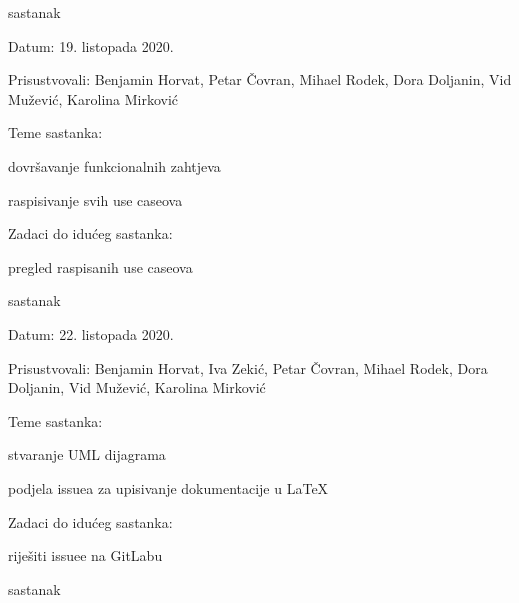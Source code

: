 \begin{packed_enum}
		\item  sastanak
		
		\item[] \begin{packed_item}
			\item Datum: 19. listopada 2020.
			\item Prisustvovali: Benjamin Horvat, Petar Čovran, Mihael Rodek, Dora Doljanin, Vid Mužević, Karolina Mirković
			\item Teme sastanka:
			\begin{packed_item}
				\item  dovršavanje funkcionalnih zahtjeva
				\item  raspisivanje svih use caseova
			\end{packed_item}
			\item Zadaci do idućeg sastanka:
			\begin{packed_item}
				\item  pregled raspisanih use caseova
			\end{packed_item}
		\end{packed_item}
	
		\item  sastanak
		
		\item[] \begin{packed_item}
			\item Datum: 22. listopada 2020.
			\item Prisustvovali: Benjamin Horvat, Iva Zekić, Petar Čovran, Mihael Rodek, Dora Doljanin, Vid Mužević, Karolina Mirković
			\item Teme sastanka:
			\begin{packed_item}
				\item  stvaranje UML dijagrama
				\item  podjela issuea za upisivanje dokumentacije u LaTeX
			\end{packed_item}
			\item Zadaci do idućeg sastanka:
			\begin{packed_item}
				\item  riješiti issuee na GitLabu
			\end{packed_item}
		\end{packed_item}
	
		\item  sastanak
		

\end{packed_enum}
